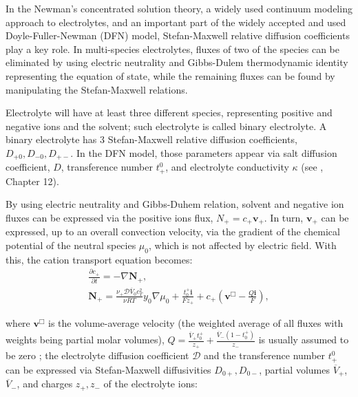 \documentclass[../main.tex]{subfiles}
\begin{document}

In the Newman's concentrated solution theory, a widely used continuum modeling approach to electrolytes, and an important part of the widely accepted and used Doyle-Fuller-Newman (DFN)  model,
Stefan-Maxwell relative diffusion coefficients play a key role. In multi-species electrolytes,
fluxes of two of the species can be eliminated by using electric neutrality and Gibbs-Dulem thermodynamic identity representing the equation of state,
while the remaining fluxes can be found by manipulating the Stefan-Maxwell relations.

Electrolyte will have at least three different species, representing positive and negative ions and the solvent; such electrolyte is called binary electrolyte. A binary electrolyte has 3 Stefan-Maxwell relative diffusion coefficients, $D_{+0}, D_{-0}, D_{+-}$. In the DFN model, those parameters appear via salt diffusion coefficient, $D$, transference number $t_+^0$, and electrolyte conductivity $\kappa$ (see , Chapter 12).

By using electric neutrality and Gibbs-Duhem relation, solvent and negative ion fluxes can be expressed via the positive ions flux,
$N_+ = c_+ \mathbf{v}_+$.
In turn, $\mathbf{v}_+$ can be expressed, up to an overall convection velocity, via the gradient of
the chemical potential of the neutral species $\mu_0$, which is not affected by electric field. With this, the cation transport equation becomes:
\begin{equation} \begin{array}{l}
    \displaystyle \frac{\partial c_+}{\partial t} = - \nabla \mathbf{N}_+  ,
     \\
     \mathbf{N}_+ = \displaystyle \frac{\nu_+ \mathcal{D} \overline{V}_0 c_T^2 }{\nu R T} y_0 \nabla \mu_0 + \frac{t_0^+ \mathbf{i}}{F z_+ } + c_+ \left( \mathbf{v}^{\Box} -\frac{Q \mathbf{i} }{F}\right),
    \label{cp diff elec}
\end{array} \end{equation}

\noindent where $\mathbf{v}^{\Box}$ is the volume-average velocity (the weighted average of all fluxes with weights being partial molar volumes),  $Q= \frac{\overline{V}_+ t_0^+}{z_+} + \frac{\overline{V}_- (1-t_0^+)}{z_-}$ is usually assumed to be zero %
; the electrolyte diffusion coefficient $\mathcal{D}$ and the transference number $t_+^0$ can be expressed via Stefan-Maxwell diffusivities $D_{0 +}, D_{0 -}$, partial volumes $\overline{V}_+$, $\overline{V}_-$, and charges $z_+, z_-$ of the electrolyte ions:
\end{document}
